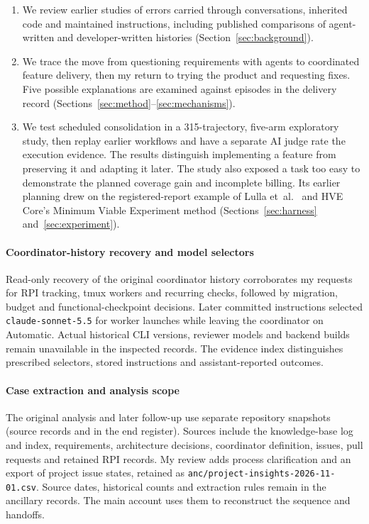 \begin{enumerate}[leftmargin=*]
\item We review earlier studies of errors carried through conversations,
inherited code and maintained instructions, including published comparisons
of agent-written and developer-written histories (Section~\ref{sec:background}).
\item We trace the move from questioning requirements with agents to
coordinated feature delivery, then my return to trying the product and
requesting fixes. Five possible explanations are examined against episodes
in the delivery record
(Sections~\ref{sec:method}--\ref{sec:mechanisms}).
\item We test scheduled consolidation in a 315-trajectory, five-arm
exploratory study, then replay earlier workflows and have a separate AI
judge rate the execution evidence. The results distinguish implementing a
feature from preserving it and adapting it later. The study also exposed
a task too easy to demonstrate the planned coverage gain and incomplete
billing. Its earlier planning drew on the registered-report example of
Lulla et~al.~\cite{lulla2026protocol} and HVE Core's Minimum Viable Experiment method
(Sections~\ref{sec:harness} and~\ref{sec:experiment}).
\end{enumerate}

\paragraph{Coordinator-history recovery and model selectors}
Read-only recovery of the original coordinator history corroborates my
requests for RPI tracking, tmux workers and recurring checks, followed by
migration, budget and functional-checkpoint decisions. Later committed
instructions selected \texttt{claude-sonnet-5.5} for worker launches while
leaving the coordinator on Automatic. Actual historical CLI versions,
reviewer models and backend builds remain unavailable in the inspected
records. The evidence index distinguishes prescribed selectors, stored
instructions and assistant-reported outcomes.

\paragraph{Case extraction and analysis scope}
The original analysis and later follow-up use separate repository snapshots
(source records  and  in the end register).
Sources include the knowledge-base
log and index, requirements, architecture decisions, coordinator definition,
issues, pull requests and retained RPI records. My review adds
process clarification and an export of project issue states, retained as
\nolinkurl{anc/project-insights-2026-11-01.csv}. Source dates, historical
counts and extraction rules remain in the ancillary records. The main
account uses them to reconstruct the sequence and handoffs.

